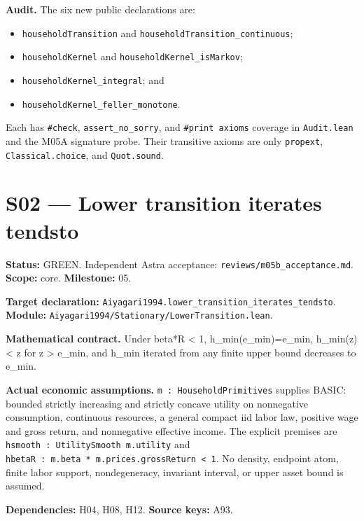 \documentclass[
  11pt,
]{article}
\providecommand{\tightlist}{%
  \setlength{\itemsep}{0pt}\setlength{\parskip}{0pt}}
\let\LedgerOriginalTexttt\texttt
\renewcommand{\texttt}[1]{{\small\LedgerOriginalTexttt{#1}}}
\begin{document}
\newpage

\textbf{Audit.} The six new public declarations are:

\begin{itemize}
\tightlist
\item
  \texttt{householdTransition} and
  \texttt{householdTransition\_continuous};
\item
  \texttt{householdKernel} and \texttt{householdKernel\_isMarkov};
\item
  \texttt{householdKernel\_integral}; and
\item
  \texttt{householdKernel\_feller\_monotone}.
\end{itemize}

Each has \texttt{\#check}, \texttt{assert\_no\_sorry}, and
\texttt{\#print\ axioms} coverage in \texttt{Audit.lean} and the M05A
signature probe. Their transitive axioms are only \texttt{propext},
\texttt{Classical.choice}, and \texttt{Quot.sound}.

\section{S02 --- Lower transition iterates
tendsto}\label{s02-lower-transition-iterates-tendsto}

\textbf{Status:} GREEN. Independent Astra acceptance:
\texttt{reviews/m05b\_acceptance.md}. \textbf{Scope:} core.
\textbf{Milestone:} 05.

\textbf{Target declaration:}
\texttt{Aiyagari1994.lower\_transition\_iterates\_tendsto}.\\
\textbf{Module:} \texttt{Aiyagari1994/Stationary/LowerTransition.lean}.

\textbf{Mathematical contract.} Under beta*R \textless{} 1,
h\_min(e\_min)=e\_min, h\_min(z) \textless{} z for z \textgreater{}
e\_min, and h\_min iterated from any finite upper bound decreases to
e\_min.

\textbf{Actual economic assumptions.} \texttt{m\ :\ HouseholdPrimitives}
supplies BASIC: bounded strictly increasing and strictly concave utility
on nonnegative consumption, continuous resources, a general compact iid
labor law, positive wage and gross return, and nonnegative effective
income. The explicit premises are
\texttt{hsmooth\ :\ UtilitySmooth\ m.utility} and
\texttt{hbetaR\ :\ m.beta\ *\ m.prices.grossReturn\ \textless{}\ 1}. No
density, endpoint atom, finite labor support, nondegeneracy, invariant
interval, or upper asset bound is assumed.

\textbf{Dependencies:} H04, H08, H12. \textbf{Source keys:} A93.
\end{document}
